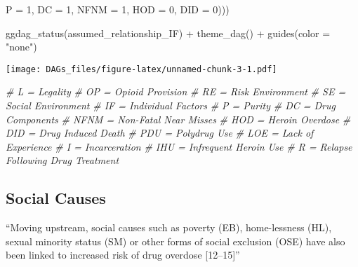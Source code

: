 \documentclass[
]{article}
\newenvironment{Shaded}{\begin{snugshade}}{\end{snugshade}}
\newcommand{\AttributeTok}[1]{\textcolor[rgb]{0.77,0.63,0.00}{#1}}
\newcommand{\CommentTok}[1]{\textcolor[rgb]{0.56,0.35,0.01}{\textit{#1}}}
\newcommand{\DecValTok}[1]{\textcolor[rgb]{0.00,0.00,0.81}{#1}}
\newcommand{\FunctionTok}[1]{\textcolor[rgb]{0.00,0.00,0.00}{#1}}
\newcommand{\NormalTok}[1]{#1}
\newcommand{\SpecialCharTok}[1]{\textcolor[rgb]{0.00,0.00,0.00}{#1}}
\newcommand{\StringTok}[1]{\textcolor[rgb]{0.31,0.60,0.02}{#1}}
\begin{document}
\begin{Shaded}
\begin{Highlighting}[]
                                                              \AttributeTok{P =} \DecValTok{1}\NormalTok{,}
                                                              \AttributeTok{DC =} \DecValTok{1}\NormalTok{,}
                                                              \AttributeTok{NFNM =} \DecValTok{1}\NormalTok{,}
                                                              \AttributeTok{HOD =} \DecValTok{0}\NormalTok{,}
                                                              \AttributeTok{DID =} \DecValTok{0}\NormalTok{)))}

\FunctionTok{ggdag\_status}\NormalTok{(assumed\_relationship\_IF) }\SpecialCharTok{+}
  \FunctionTok{theme\_dag}\NormalTok{() }\SpecialCharTok{+}
  \FunctionTok{guides}\NormalTok{(}\AttributeTok{color =} \StringTok{"none"}\NormalTok{)}
\end{Highlighting}
\end{Shaded}

\texttt{[image: DAGs\_files/figure-latex/unnamed-chunk-3-1.pdf]}

\begin{Shaded}
\begin{Highlighting}[]
\CommentTok{\# L = Legality}
\CommentTok{\# OP = Opioid Provision}
\CommentTok{\# RE = Risk Environment}
\CommentTok{\# SE = Social Environment}
\CommentTok{\# IF = Individual Factors}
\CommentTok{\# P = Purity}
\CommentTok{\# DC = Drug Components}
\CommentTok{\# NFNM = Non{-}Fatal Near Misses}
\CommentTok{\# HOD = Heroin Overdose}
\CommentTok{\# DID = Drug Induced Death }
\CommentTok{\# PDU = Polydrug Use}
\CommentTok{\# LOE = Lack of Experience}
\CommentTok{\# I = Incarceration}
\CommentTok{\# IHU = Infrequent Heroin Use}
\CommentTok{\# R = Relapse Following Drug Treatment}
\end{Highlighting}
\end{Shaded}

\hypertarget{social-causes}{%
\subsection{Social Causes}\label{social-causes}}

``Moving upstream, social causes such as poverty (EB), home-lessness
(HL), sexual minority status (SM) or other forms of social exclusion
(OSE) have also been linked to increased risk of drug overdose
{[}12--15{]}''
\end{document}

